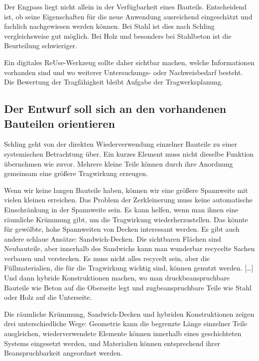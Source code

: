 Der Engpass liegt nicht allein in der Verfügbarkeit eines Bauteils. Entscheidend ist, ob seine Eigenschaften für die neue Anwendung ausreichend eingeschätzt und fachlich nachgewiesen werden können. Bei Stahl ist dies nach Schling vergleichsweise gut möglich. Bei Holz und besonders bei Stahlbeton ist die Beurteilung schwieriger.

Ein digitales ReUse-Werkzeug sollte daher sichtbar machen, welche Informationen vorhanden sind und wo weiterer Untersuchungs- oder Nachweisbedarf besteht. Die Bewertung der Tragfähigkeit bleibt Aufgabe der Tragwerksplanung.

\subsection{Der Entwurf soll sich an den vorhandenen Bauteilen orientieren}

Schling geht von der direkten Wiederverwendung einzelner Bauteile zu einer systemischen Betrachtung über. Ein kurzes Element muss nicht dieselbe Funktion übernehmen wie zuvor. Mehrere kleine Teile können durch ihre Anordnung gemeinsam eine größere Tragwirkung erzeugen.

\begin{Blockquote}
Wenn wir keine langen Bauteile haben, können wir eine größere Spannweite mit vielen kleinen erreichen. Das Problem der Zerkleinerung muss keine automatische Einschränkung in der Spannweite sein. Es kann helfen, wenn man ihnen eine räumliche Krümmung gibt, um die Tragwirkung wiederherzustellen. Das könnte für gewölbte, hohe Spannweiten von Decken interessant werden. Es gibt auch andere schlaue Ansätze: Sandwich-Decken. Die sichtbaren Flächen sind Neubauteile, aber innerhalb des Sandwichs kann man wunderbar recycelte Sachen verbauen und verstecken. Es muss nicht alles recycelt sein, aber die Füllmaterialien, die für die Tragwirkung wichtig sind, können genutzt werden. […] Und dann hybride Konstruktionen machen, wo man druckbeanspruchbare Bauteile wie Beton auf die Oberseite legt und zugbeanspruchbare Teile wie Stahl oder Holz auf die Unterseite.
\end{Blockquote}

Die räumliche Krümmung, Sandwich-Decken und hybriden Konstruktionen zeigen drei unterschiedliche Wege: Geometrie kann die begrenzte Länge einzelner Teile ausgleichen, wiederverwendete Elemente können innerhalb eines geschichteten Systems eingesetzt werden, und Materialien können entsprechend ihrer Beanspruchbarkeit angeordnet werden.

